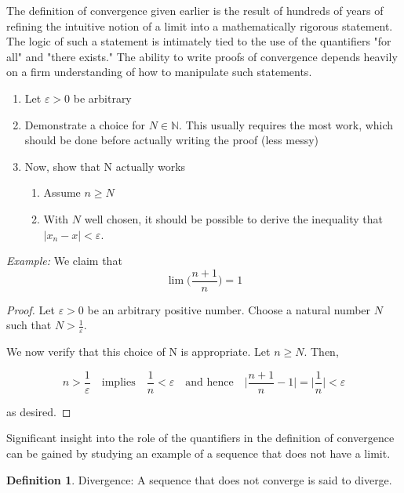 \documentclass{tufte-book}
\theoremstyle{definition}
\newtheorem{definition}{Definition}[chapter]
\numberwithin{section}{chapter}
\begin{document}
The  definition of convergence given earlier is the result of hundreds of years of refining the intuitive notion of a limit into a mathematically rigorous statement.  The logic of such a statement is intimately tied to the use of the quantifiers "for all" and "there exists."  The ability to write proofs of convergence depends heavily on a firm understanding of how to manipulate such statements.

	\begin{enumerate}
			\item Let $\varepsilon>0$ be arbitrary
			\item  Demonstrate a choice for $N \in \mathbb{N}$.  This usually requires the most work, which should be done before actually writing the proof (less messy)
			\item Now, show that N actually works
				\begin{enumerate}
						\item Assume $n \geq N$
						\item With $N$ well chosen, it should be possible to derive the inequality that $|x_{n} - x| < \varepsilon$.
				\end{enumerate}
	\end{enumerate}


\noindent \emph{Example:}  We claim that $$ \lim \bigg( \frac{n+1}{n} \bigg) = 1 $$

\begin{proof}
Let $\varepsilon >0$ be an arbitrary positive number.  Choose a natural number $N$ such that $ N > \frac{1}{\varepsilon}	$.


We now verify that this choice of N is appropriate.  Let $n \geq N$.  Then,

$$	n> \frac{1}{\varepsilon}	  \quad \text{implies} \quad \frac{1}{n} < \varepsilon \quad \text{and hence} \quad \bigg|  \frac{n+1}{n}  -1  \bigg|  = \bigg|  \frac{1}{n} \bigg|< \varepsilon$$

as desired.
\end{proof}



Significant insight into the role of the quantifiers in the definition of convergence
can be gained by studying an example of a sequence that does not have a limit.

\begin{definition}Divergence:  A sequence that does not converge is said to diverge. \end{definition}
\end{document}
